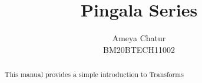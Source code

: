 \documentclass[journal,12pt,twocolumn]{IEEEtran}
\begin{document}
\renewcommand{\thefigure}{\arabic{section}.\arabic{figure}}
\makeatletter
{}
\makeatother
\def\putbox#1#2#3{\makebox[0in][l]{\makebox[#1][l]{}\raisebox{\baselineskip}[0in][0in]{\raisebox{#2}[0in][0in]{#3}}}}
     \def\rightbox#1{\makebox[0in][r]{#1}}
     \def\centbox#1{\makebox[0in]{#1}}
     \def\topbox#1{\raisebox{-\baselineskip}[0in][0in]{#1}}
     \def\midbox#1{\raisebox{-0.5\baselineskip}[0in][0in]{#1}}
\vspace{3cm}
\title{ 
Pingala Series
}
%
%
%
\author{Ameya Chatur\\BM20BTECH11002}
\maketitle
\tableofcontents
\bigskip
\begin{abstract}
This manual provides a simple introduction to Transforms
\end{abstract}
\end{document}

